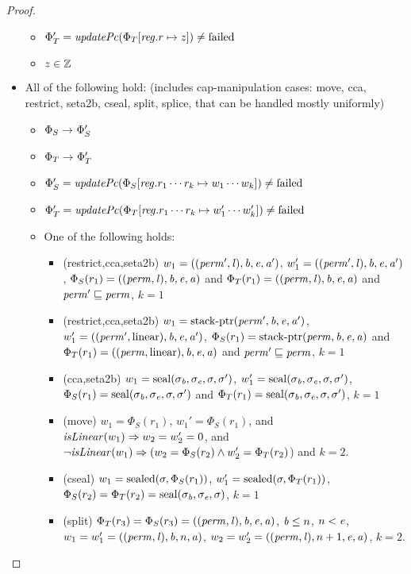\documentclass[a4paper]{article}
\begin{document}
\begin{proof}
\begin{itemize}
\begin{itemize}
  \item $\Phi_T' = \updPcAddr{\Phi_T\updReg{r}{z}} \neq \failed$
  \item $z \in \mathbb{Z}$
  \end{itemize}
\item All of the following hold: (includes cap-manipulation cases: move, cca, restrict, seta2b, cseal, split, splice, that can be handled mostly uniformly)
  \begin{itemize}
  \item $\Phi_S \rightarrow^{} \Phi_S'$
  \item $\Phi_T \rightarrow^{} \Phi_T'$
  \item $\Phi_S' = \updPcAddr{\Phi_S\updReg{r_1\cdots r_k}{w_1\cdots w_k}}\neq \failed$
  \item $\Phi_T' = \updPcAddr{\Phi_T\updReg{r_1\cdots r_k}{w_1'\cdots w_k'}} \neq \failed$
  \item One of the following holds:
    \begin{itemize}
    \item (restrict,cca,seta2b) $w_1 = ((\mathit{perm}',\mathit{l}),\mathit{b},\mathit{e},\mathit{a}')$, $w_1' = ((\mathit{perm}',\mathit{l}),\mathit{b},\mathit{e},\mathit{a}')$, $\Phi_S(r_1) = ((\mathit{perm},\mathit{l}),\mathit{b},\mathit{e},\mathit{a})$ and $\Phi_T(r_1) = ((\mathit{perm},\mathit{l}),\mathit{b},\mathit{e},\mathit{a})$ and $\mathit{perm}' \sqsubseteq\mathit{perm}$, $k = 1$
    \item (restrict,cca,seta2b) $w_1 = \mathrm{stack\text{-}ptr}(\mathit{perm}',\mathit{b},\mathit{e},\mathit{a}')$, $w_1' = ((\mathit{perm}',\mathrm{linear}),\mathit{b},\mathit{e},\mathit{a}')$, $\Phi_S(r_1) = \mathrm{stack\text{-}ptr}(\mathit{perm},\mathit{b},\mathit{e},\mathit{a})$ and $\Phi_T(r_1) = ((\mathit{perm},\mathrm{linear}),\mathit{b},\mathit{e},\mathit{a})$ and $\mathit{perm}' \sqsubseteq\mathit{perm}$, $k = 1$
    \item (cca,seta2b) $w_1 = \mathrm{seal}(\sigma_{\mathit{b}},\sigma_{\mathit{e}},\sigma,\sigma')$, $w_1' = \mathrm{seal}(\sigma_{\mathit{b}},\sigma_{\mathit{e}},\sigma,\sigma')$, $\Phi_S(r_1) = \mathrm{seal}(\sigma_{\mathit{b}},\sigma_{\mathit{e}},\sigma,\sigma')$ and $\Phi_T(r_1) = \mathrm{seal}(\sigma_{\mathit{b}},\sigma_{\mathit{e}},\sigma,\sigma')$, $k = 1$
    \item (move) $w_1 = \Phi_S(r_1)$, $w_1' = \Phi_S(r_1)$, and
      $\isLinear{w_1} \Rightarrow w_2 = w_2' = 0$, and $\neg
      \isLinear{w_1} \Rightarrow (w_2 = \Phi_S(r_2) \wedge w_2' = \Phi_T(r_2)$)
      and $k = 2$.
    \item (cseal) $w_1 = \mathrm{sealed}(\sigma,\Phi_S(r_1))$, $w_1' = \mathrm{sealed}(\sigma,\Phi_T(r_1))$, $\Phi_S(r_2) = \Phi_T(r_2) = \mathrm{seal}(\sigma_{\mathit{b}},\sigma_{\mathit{e}},\sigma)$, $k=1$
    \item (split) $\Phi_T(r_3) = \Phi_S(r_3) = ((\mathit{perm},\mathit{l}),\mathit{b},\mathit{e},\mathit{a})$, $\mathit{b} \leq n$, $n < \mathit{e}$, $w_1 = w_1' = ((\mathit{perm},\mathit{l}),\mathit{b},n,\mathit{a})$, $w_2 = w_2' = ((\mathit{perm},\mathit{l}),n+1,\mathit{e},\mathit{a})$, $k=2$.

\end{itemize}
\end{itemize}
\end{itemize}
\end{proof}
\end{document}
